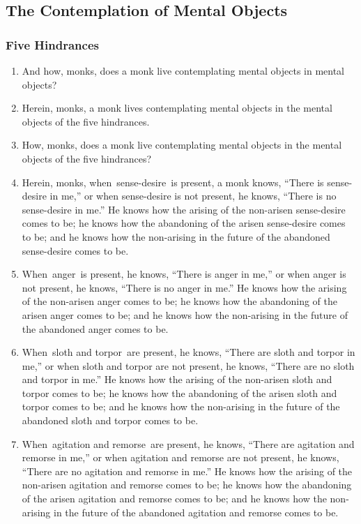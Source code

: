 \documentclass[a4 paper, 12pt]{article}
\begin{document}
\subsection*{The Contemplation of Mental Objects}
\subsubsection*{Five Hindrances}
\begin{enumerate}[resume]
\item And how, monks, does a monk live contemplating mental objects in mental objects?
\item Herein, monks, a monk lives contemplating mental objects in the mental objects of the five hindrances.
\item How, monks, does a monk live contemplating mental objects in the mental objects of the five hindrances?
\item Herein, monks, when sense-desire is present, a monk knows, “There is sense-desire in me,” or when sense-desire is not present, he knows, “There is no sense-desire in me.” He knows how the arising of the non-arisen sense-desire comes to be; he knows how the abandoning of the arisen sense-desire comes to be; and he knows how the non-arising in the future of the abandoned sense-desire comes to be.
\item When anger is present, he knows, “There is anger in me,” or when anger is not present, he knows, “There is no anger in me.” He knows how the arising of the non-arisen anger comes to be; he knows how the abandoning of the arisen anger comes to be; and he knows how the non-arising in the future of the abandoned anger comes to be.
\item When sloth and torpor are present, he knows, “There are sloth and torpor in me,” or when sloth and torpor are not present, he knows, “There are no sloth and torpor in me.” He knows how the arising of the non-arisen sloth and torpor comes to be; he knows how the abandoning of the arisen sloth and torpor comes to be; and he knows how the non-arising in the future of the abandoned sloth and torpor comes to be.
\item When agitation and remorse are present, he knows, “There are agitation and remorse in me,” or when agitation and remorse are not present, he knows, “There are no agitation and remorse in me.” He knows how the arising of the non-arisen agitation and remorse comes to be; he knows how the abandoning of the arisen agitation and remorse comes to be; and he knows how the non-arising in the future of the abandoned agitation and remorse comes to be.

\end{enumerate}
\end{document}
